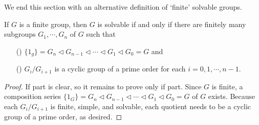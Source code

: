 We end this section with an alternative definition of `finite' solvable groups.
\begin{prop}
    If $G$ is a finite group, then $G$ is solvable if and only if there are finitely many subgroups $G_1, \cdots, G_n$ of $G$ such that
    \begin{enumerate}
        \item[(\romannumeral 1)]
        {
            $\{1_g\}=G_n\triangleleft G_{n-1}\triangleleft \cdots\triangleleft G_1\triangleleft G_0=G$ and
        }
        \item[(\romannumeral 2)]
        {
            $G_i/G_{i+1}$ is a cyclic group of a prime order for each $i=0, 1, \cdots, n-1$.
        }
    \end{enumerate}
\end{prop}
\begin{proof}
    If part is clear, so it remains to prove only if part.
    Since $G$ is finite, a composition series $\{1_G\}=G_n\triangleleft G_{n-1}\triangleleft \cdots\triangleleft G_1\triangleleft G_0=G$ of $G$ exists.
    Because each $G_i/G_{i+1}$ is finite, simple, and solvable, each quotient needs to be a cyclic group of a prime order, as desired.
\end{proof}